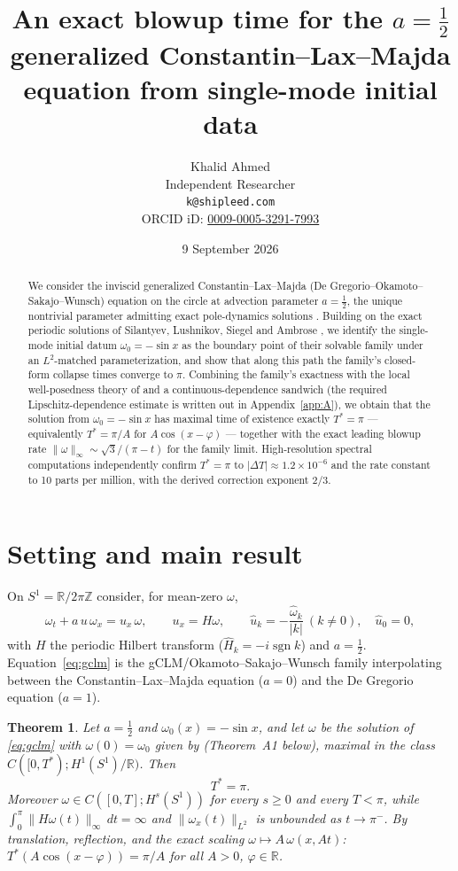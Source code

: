 \documentclass[11pt,a4paper]{article}
\title{An exact blowup time for the \texorpdfstring{$a=\tfrac12$}{a = 1/2} generalized Constantin--Lax--Majda equation from single-mode initial data}
\author{Khalid Ahmed\\[2pt]
\small Independent Researcher\\
\small \texttt{k@shipleed.com}\\
\small ORCID iD: \href{https://orcid.org/0009-0005-3291-7993}{0009-0005-3291-7993}}
\date{9 September 2026}
\theoremstyle{plain}
\newtheorem{theorem}{Theorem}
\theoremstyle{definition}
\theoremstyle{plain}
\newcommand{\R}{\mathbb{R}}
\newcommand{\Z}{\mathbb{Z}}
\newcommand{\Sone}{S^1}
\newcommand{\nrm}[1]{\lVert #1 \rVert}
\newcommand{\abs}[1]{\lvert #1 \rvert}
\DeclareMathOperator{\sgn}{sgn}
\begin{document}
\maketitle

\begin{abstract}
We consider the inviscid generalized Constantin--Lax--Majda (De Gregorio--Okamoto--Sakajo--Wunsch) equation on the circle at advection parameter $a=\tfrac12$, the unique nontrivial parameter admitting exact pole-dynamics solutions \cite{LSS21}. Building on the exact periodic solutions of Silantyev, Lushnikov, Siegel and Ambrose \cite{SLSA25}, we identify the single-mode initial datum $\omega_0=-\sin x$ as the boundary point of their solvable family under an $L^2$-matched parameterization, and show that along this path the family's closed-form collapse times converge to $\pi$. Combining the family's exactness with the local well-posedness theory of \cite{OSW08} and a continuous-dependence sandwich (the required Lipschitz-dependence estimate is written out in Appendix~\ref{app:A}), we obtain that the solution from $\omega_0=-\sin x$ has maximal time of existence exactly $T^*=\pi$ --- equivalently $T^*=\pi/A$ for $A\cos(x-\varphi)$ --- together with the exact leading blowup rate $\nrm{\omega}_\infty\sim\sqrt3/(\pi-t)$ for the family limit. High-resolution spectral computations independently confirm $T^*=\pi$ to $\abs{\Delta T}\approx1.2\times10^{-6}$ and the rate constant to 10 parts per million, with the derived correction exponent $2/3$.
\end{abstract}

\section{Setting and main result}\label{sec:setting}

On $\Sone=\R/2\pi\Z$ consider, for mean-zero $\omega$,
\begin{equation}\label{eq:gclm}
\omega_t + a\,u\,\omega_x = u_x\,\omega,\qquad u_x = H\omega,\qquad \hat u_k = -\frac{\hat\omega_k}{\abs{k}}\ (k\neq0),\quad \hat u_0=0,
\end{equation}
with $H$ the periodic Hilbert transform ($\hat H_k=-i\sgn k$) and $a=\tfrac12$. Equation~\eqref{eq:gclm} is the gCLM/Okamoto--Sakajo--Wunsch family \cite{OSW08} interpolating between the Constantin--Lax--Majda equation ($a=0$) \cite{CLM85} and the De Gregorio equation ($a=1$).

\begin{theorem}\label{thm:main}
Let $a=\tfrac12$ and $\omega_0(x)=-\sin x$, and let $\omega$ be the solution of \eqref{eq:gclm} with $\omega(0)=\omega_0$ given by \cite[Theorem~3.1]{OSW08} (Theorem~A1 below), maximal in the class $C([0,T^*);H^1(\Sone)/\R)$. Then
\[
T^*=\pi.
\]
Moreover $\omega\in C([0,T];H^s(\Sone))$ for every $s\ge0$ and every $T<\pi$, while $\int_0^\pi\nrm{H\omega(t)}_\infty\,dt=\infty$ and $\nrm{\omega_x(t)}_{L^2}$ is unbounded as $t\to\pi^-$. By translation, reflection, and the exact scaling $\omega\mapsto A\,\omega(x,At)$: $T^*(A\cos(x-\varphi))=\pi/A$ for all $A>0$, $\varphi\in\R$.
\end{theorem}
\end{document}
